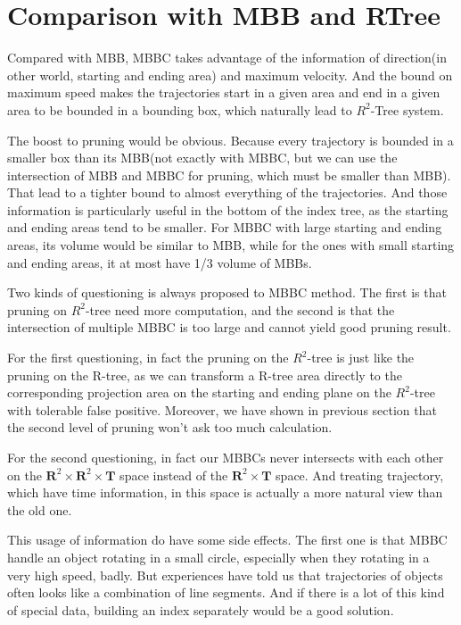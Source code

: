 \documentclass[sigplan]{acmart}
\begin{document}
\section{Comparison with MBB and RTree}
Compared with MBB, MBBC takes advantage of the information of direction(in other world, starting and ending area) and maximum velocity. And the bound on maximum speed makes the trajectories start in a given area and end in a given area to be bounded in a bounding box, which naturally lead to $R^2$-Tree system.\par
The boost to pruning would be obvious. Because every trajectory is bounded in a smaller box than its MBB(not exactly with MBBC, but we can use the intersection of MBB and MBBC for pruning, which must be smaller than MBB). That lead to a tighter bound to almost everything of the trajectories. And those information is particularly useful in the bottom of the index tree, as the starting and ending areas tend to be smaller. For MBBC with large starting and ending areas, its volume would be similar to MBB, while for the ones with small starting and ending areas, it at most have 1/3 volume of MBBs.\par
Two kinds of questioning is always proposed to MBBC method. The first is that pruning on $R^2$-tree need more computation, and the second is that the intersection of multiple MBBC is too large and cannot yield good pruning result.\par
For the first questioning, in fact the pruning on the $R^2$-tree is just like the pruning on the R-tree, as we can transform a R-tree area directly to the corresponding projection area on the starting and ending plane on the $R^2$-tree with tolerable false positive. Moreover, we have shown in previous section that the second level of pruning won't ask too much calculation.\par
For the second questioning, in fact our MBBCs never intersects with each other on the $\mathbf{R}^2 \times \mathbf{R}^2 \times \mathbf{T}$ space instead of the $\mathbf{R}^2 \times \mathbf{T}$ space. And treating trajectory, which have time information, in this space is actually a more natural view than the old one.\par
This usage of information do have some side effects. The first one is that MBBC handle an object rotating in a small circle, especially when they rotating in a very high speed, badly. But experiences have told us that trajectories of objects often looks like a combination of line segments. And if there is a lot of this kind of special data, building an index separately would be a good solution.
\end{document}
